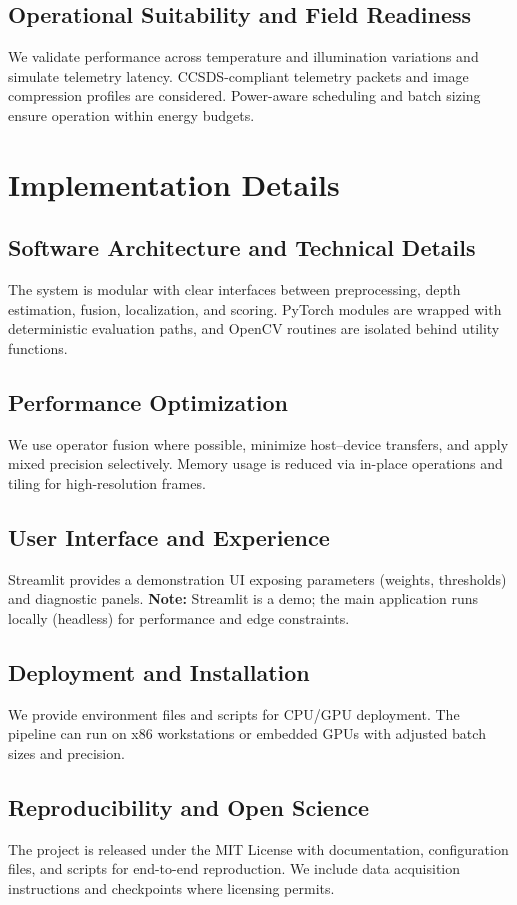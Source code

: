 \documentclass[12pt]{article}
\begin{document}
\subsection{Operational Suitability and Field Readiness}
We validate performance across temperature and illumination variations and simulate telemetry latency. CCSDS-compliant telemetry packets and image compression profiles are considered. Power-aware scheduling and batch sizing ensure operation within energy budgets.

\section{Implementation Details}
\subsection{Software Architecture and Technical Details}
The system is modular with clear interfaces between preprocessing, depth estimation, fusion, localization, and scoring. PyTorch modules are wrapped with deterministic evaluation paths, and OpenCV routines are isolated behind utility functions.

\subsection{Performance Optimization}
We use operator fusion where possible, minimize host–device transfers, and apply mixed precision selectively. Memory usage is reduced via in-place operations and tiling for high-resolution frames.

\subsection{User Interface and Experience}
Streamlit provides a demonstration UI exposing parameters (weights, thresholds) and diagnostic panels. \textbf{Note:} Streamlit is a demo; the main application runs locally (headless) for performance and edge constraints.

\subsection{Deployment and Installation}
We provide environment files and scripts for CPU/GPU deployment. The pipeline can run on x86 workstations or embedded GPUs with adjusted batch sizes and precision.

\subsection{Reproducibility and Open Science}
The project is released under the MIT License with documentation, configuration files, and scripts for end-to-end reproduction. We include data acquisition instructions and checkpoints where licensing permits.
\end{document}
